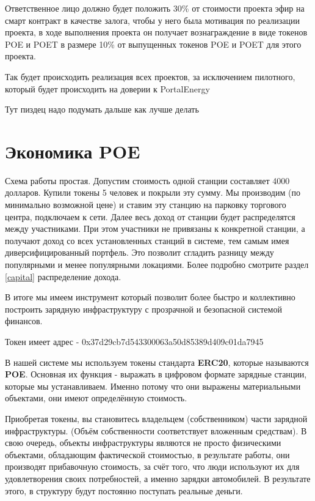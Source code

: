 \documentclass[a4paper,12pt]{report}
\newcommand{\contractAddress}{0x37d29cb7d543300063a50d85389d409c01da7945}
\begin{document}
Ответственное лицо должно будет положить 30\% от стоимости проекта эфир на смарт контракт в качестве залога, чтобы у него была мотивация по реализации проекта, в ходе выполнения проекта он получает вознаграждение в виде токенов POE и POET в размере 10\% от выпущенных токенов POE и POET для этого проекта.

Так будет происходить реализация всех проектов, за исключением пилотного, который будет происходить на доверии к PortalEnergy 

Тут пиздец надо подумать дальше как лучше делать 




\section{Экономика POE}

Схема работы простая. Допустим стоимость одной станции составляет 4000 долларов. Купили токены 5 человек и покрыли эту сумму. Мы производим (по минимально возможной цене) и ставим эту станцию на парковку торгового центра, подключаем к сети. 
Далее весь доход от станции будет распределятся между участниками. При этом участники не привязаны к конкретной станции, а получают доход со всех установленных станций в системе, тем самым имея диверсифицированный портфель. Это позволит сгладить разницу между популярными и менее популярными локациями. 
Более подробно смотрите раздел \ref{capital} распределение дохода.

В итоге мы имеем инструмент который позволит более быстро и коллективно построить зарядную инфраструктуру с прозрачной и безопасной системой финансов.

Токен имеет адрес - \contractAddress 


В нашей системе мы используем токены стандарта \textbf{ERC20}, которые называются \textbf{POE}. Основная их функция - выражать в цифровом формате зарядные станции, которые мы устанавливаем. Именно потому что они выражены материальными объектами, они имеют
определённую стоимость.

Приобретая токены, вы становитесь владельцем (собственником) части зарядной инфраструктуры. (Объём собственности соответствует вложенным средствам). В свою очередь, объекты инфраструктуры являются не просто физическими объектами, обладающим фактической стоимостью, в результате работы, они производят прибавочную стоимость, за счёт того, что люди используют их для удовлетворения своих потребностей, а именно зарядки автомобилей. В результате этого, в структуру будут постоянно поступать реальные деньги.
\end{document}
